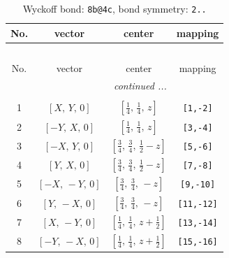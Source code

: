 \documentclass[fleqn,8pt]{jsarticle}
\begin{document}
\begin{longtable}{cccc}
\caption{Wyckoff bond: {\tt 8b@4c}, bond symmetry: {\tt 2..}}
 \\
 \hline \hline
No. & vector & center & mapping \\ \hline \endfirsthead

\multicolumn{3}{l}{\tablename\ \thetable{}} \\
 \hline \hline
No. & vector & center & mapping \\ \hline \endhead

 \hline \hline
\multicolumn{3}{r}{\footnotesize\it continued ...} \\ \endfoot

 \hline \hline
\multicolumn{3}{r}{} \\ \endlastfoot

1 & $\left[ X,\, Y,\, 0 \right]$ & $\left[ \frac{1}{4},\, \frac{1}{4},\, z \right]$ & {\tt [1,-2]} \\ \hline
2 & $\left[ - Y,\, X,\, 0 \right]$ & $\left[ \frac{1}{4},\, \frac{1}{4},\, z \right]$ & {\tt [3,-4]} \\ \hline
3 & $\left[ - X,\, Y,\, 0 \right]$ & $\left[ \frac{3}{4},\, \frac{3}{4},\, \frac{1}{2} - z \right]$ & {\tt [5,-6]} \\ \hline
4 & $\left[ Y,\, X,\, 0 \right]$ & $\left[ \frac{3}{4},\, \frac{3}{4},\, \frac{1}{2} - z \right]$ & {\tt [7,-8]} \\ \hline
5 & $\left[ - X,\, - Y,\, 0 \right]$ & $\left[ \frac{3}{4},\, \frac{3}{4},\, - z \right]$ & {\tt [9,-10]} \\ \hline
6 & $\left[ Y,\, - X,\, 0 \right]$ & $\left[ \frac{3}{4},\, \frac{3}{4},\, - z \right]$ & {\tt [11,-12]} \\ \hline
7 & $\left[ X,\, - Y,\, 0 \right]$ & $\left[ \frac{1}{4},\, \frac{1}{4},\, z + \frac{1}{2} \right]$ & {\tt [13,-14]} \\ \hline
8 & $\left[ - Y,\, - X,\, 0 \right]$ & $\left[ \frac{1}{4},\, \frac{1}{4},\, z + \frac{1}{2} \right]$ & {\tt [15,-16]} \\
\end{longtable}
\renewcommand{\arraystretch}{1.2}
\end{document}
